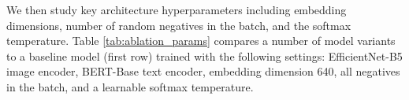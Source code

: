 \documentclass{article}
\begin{document}

We then study key architecture hyperparameters including embedding dimensions,
 number of random negatives in the batch, and the softmax temperature. Table \ref{tab:ablation_params} compares a number of model variants to a baseline model (first row) trained with the following settings: EfficientNet-B5 image encoder, BERT-Base text encoder, embedding dimension 640, all negatives in the batch, and a learnable softmax temperature.
\end{document}
